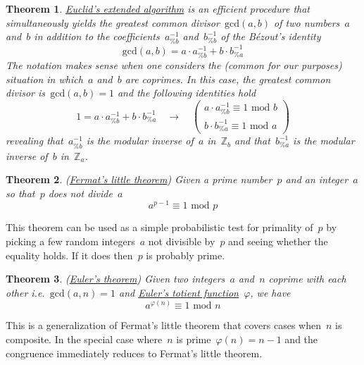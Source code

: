\documentclass{article}
\newtheorem{theorem}{Theorem}
\begin{document}
\begin{theorem} \href{https://en.wikipedia.org/wiki/Extended_Euclidean_algorithm}{\hypertarget{theorem1}{Euclid's extended algorithm}} is an efficient procedure that simultaneously yields the greatest common divisor~$\text{gcd}(a,b)$ of two numbers~$a$ and~$b$ in addition to the coefficients~$a^{-1}_{\%b}$ and~$b^{-1}_{\%b}$ of the B\'ezout's identity
\begin{equation*}
\text{gcd} (a, b)  =  a \cdot a^{-1}_{\%b} + b \cdot b^{-1}_{\%a}
\end{equation*}
The notation makes sense when one considers the (common for our purposes) situation in which~$a$ and~$b$ are coprimes.  In this case, the greatest common divisor is~$\text{gcd}(a, b) = 1$ and the following identities hold
\begin{equation*}
1 = a \cdot a^{-1}_{\%b} + b \cdot b^{-1}_{\%a}  \quad \rightarrow \quad \begin{pmatrix}
a \cdot a^{-1}_{\%b} \equiv 1 \,\,\text{mod}\,\,b \\[0.3em]
b \cdot b^{-1}_{\%a} \equiv 1 \,\,\text{mod}\,\,a
\end{pmatrix}
\end{equation*}
revealing that~$a^{-1}_{\%b}$ is the modular inverse of~$a$ in~$\mathbb{Z}_b$ and that~$b^{-1}_{\%a}$ is the modular inverse of~$b$ in~$\mathbb{Z}_a$.
\end{theorem}

\begin{theorem}
(\href{https://en.wikipedia.org/wiki/Fermat\%27s_little_theorem}{\hypertarget{theorem2}{Fermat's little theorem}}) Given a prime number~$p$ and an integer~$a$ so that~$p$ does not divide~$a$
\begin{equation*}
a^{p-1} \equiv 1 \,\,\text{mod}\,\, p
\end{equation*}
\end{theorem}
This theorem can be used as a simple probabilistic test for primality of~$p$ by picking a few random integers~$a$ not divisible by~$p$ and seeing whether the equality holds.  If it does then~$p$ is probably prime.

\begin{theorem}
(\href{https://en.wikipedia.org/wiki/Euler\%27s_theorem}{\hypertarget{theorem3}{Euler's theorem}}) Given two integers~$a$ and~$n$ coprime with each other i.e.\ $\text{gcd}(a,n)=1$ and \href{https://en.wikipedia.org/wiki/Euler\%27s_totient_function}{Euler's totient function}~$\varphi$, we have
\begin{equation*}
a^{\varphi(n)} \equiv 1 \,\,\text{mod}\,\,n
\end{equation*}
\end{theorem}
This is a generalization of Fermat's little theorem that covers cases when~$n$ is composite. In the special case where~$n$ is prime~$\varphi(n) = n-1$ and the congruence immediately reduces to Fermat's little theorem.
\end{document}

